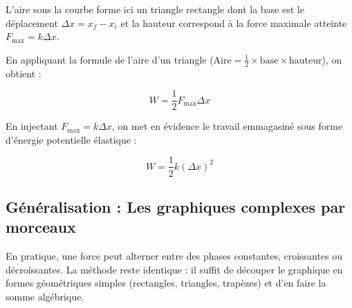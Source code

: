 \documentclass[11pt,openany]{book}
\begin{document}
\begin{center}
\end{center}

L'aire sous la courbe forme ici un triangle rectangle dont la base est le déplacement $\Delta x = x_f - x_i$ et la hauteur correspond à la force maximale atteinte $F_{\text{max}} = k \Delta x$. 

En appliquant la formule de l'aire d'un triangle ($\text{Aire} = \frac{1}{2} \times \text{base} \times \text{hauteur}$), on obtient :

\[
W = \frac{1}{2} F_{\text{max}} \Delta x
\]

En injectant $F_{\text{max}} = k \Delta x$, on met en évidence le travail emmagasiné sous forme d'énergie potentielle élastique :

\[
\boxed{W = \frac{1}{2} k (\Delta x)^2}
\]

\subsection{Généralisation : Les graphiques complexes par morceaux}

En pratique, une force peut alterner entre des phases constantes, croissantes ou décroissantes. La méthode reste identique : il suffit de découper le graphique en formes géométriques simples (rectangles, triangles, trapèzes) et d'en faire la somme algébrique.
\end{document}
